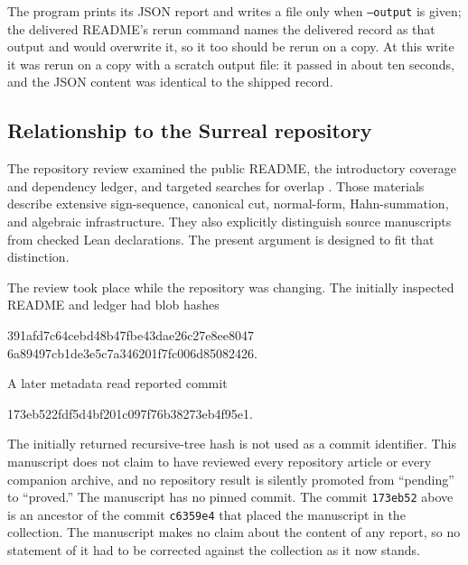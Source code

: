 \documentclass[11pt]{article}
\theoremstyle{definition}
\theoremstyle{remark}
\begin{document}
The program prints its JSON report and writes a file only when
\texttt{--output} is given; the delivered README's rerun command names the
delivered record as that output and would overwrite it, so it too should
be rerun on a copy. At this write it was rerun on a copy with a scratch
output file: it passed in about ten seconds, and the JSON content was
identical to the shipped record.

\subsection{Relationship to the Surreal repository}
The repository review examined the public README, the introductory
coverage and dependency ledger, and targeted searches for overlap
\cite{Repo}. Those materials describe extensive sign-sequence, canonical
cut, normal-form, Hahn-summation, and algebraic infrastructure. They also
explicitly distinguish source manuscripts from checked Lean declarations.
The present argument is designed to fit that distinction.

The review took place while the repository was changing. The initially
inspected README and ledger had blob hashes
\begin{center}\small\ttfamily
391afd7c64cebd48b47fbe43dae26c27e8ee8047\\
6a89497cb1de3e5c7a346201f7fc006d85082426.
\end{center}
A later metadata read reported commit
\begin{center}\small\ttfamily
173eb522fdf5d4bf201c097f76b38273eb4f95e1.
\end{center}
The initially returned recursive-tree hash is not used as a commit
identifier. This manuscript does not claim to have reviewed every
repository article or every companion archive, and no repository result
is silently promoted from ``pending'' to ``proved.''
The manuscript has no pinned commit. The commit \texttt{173eb52} above
is an ancestor of the commit \texttt{c6359e4} that placed the manuscript
in the collection. The manuscript makes no claim about the content of
any report, so no statement of it had to be corrected against the
collection as it now stands.
\end{document}
